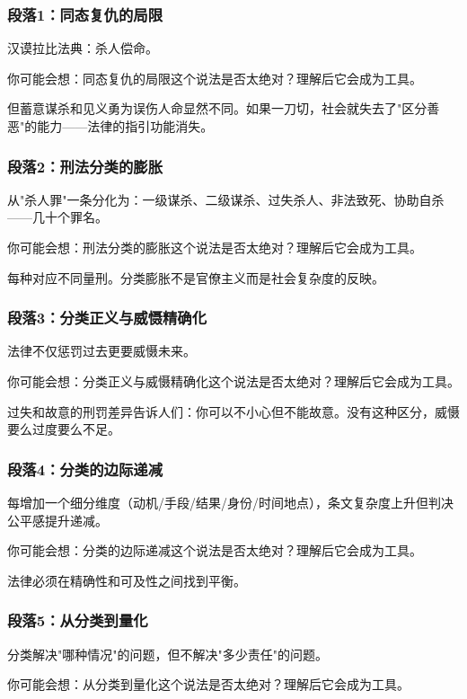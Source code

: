 \documentclass[a4paper,12pt]{book}
\newenvironment{motivation}{\begin{tcolorbox}[colback=gray!10,colframe=gray!60,title=\textit{本章动机},fonttitle=\bfseries,arc=0mm,leftrule=3mm]\small\itshape}{\end{tcolorbox}}
\begin{document}
\begin{motivation}
\begin{motivation}
\begin{motivation}
	\subsubsection*{段落1：同态复仇的局限}
	汉谟拉比法典：杀人偿命。
	\begin{tcolorbox}[colback=yellow!5, title=\textit{读者行为预测}]
		你可能会想：同态复仇的局限这个说法是否太绝对？理解后它会成为工具。
	\end{tcolorbox}

但蓄意谋杀和见义勇为误伤人命显然不同。如果一刀切，社会就失去了"区分善恶"的能力——法律的指引功能消失。

	\subsubsection*{段落2：刑法分类的膨胀}
	从"杀人罪"一条分化为：一级谋杀、二级谋杀、过失杀人、非法致死、协助自杀——几十个罪名。
	\begin{tcolorbox}[colback=yellow!5, title=\textit{读者行为预测}]
		你可能会想：刑法分类的膨胀这个说法是否太绝对？理解后它会成为工具。
	\end{tcolorbox}

每种对应不同量刑。分类膨胀不是官僚主义而是社会复杂度的反映。

	\subsubsection*{段落3：分类正义与威慑精确化}
	法律不仅惩罚过去更要威慑未来。
	\begin{tcolorbox}[colback=yellow!5, title=\textit{读者行为预测}]
		你可能会想：分类正义与威慑精确化这个说法是否太绝对？理解后它会成为工具。
	\end{tcolorbox}

过失和故意的刑罚差异告诉人们：你可以不小心但不能故意。没有这种区分，威慑要么过度要么不足。

	\subsubsection*{段落4：分类的边际递减}
	每增加一个细分维度（动机/手段/结果/身份/时间地点），条文复杂度上升但判决公平感提升递减。
	\begin{tcolorbox}[colback=yellow!5, title=\textit{读者行为预测}]
		你可能会想：分类的边际递减这个说法是否太绝对？理解后它会成为工具。
	\end{tcolorbox}

法律必须在精确性和可及性之间找到平衡。

	\subsubsection*{段落5：从分类到量化}
	分类解决"哪种情况"的问题，但不解决"多少责任"的问题。
	\begin{tcolorbox}[colback=yellow!5, title=\textit{读者行为预测}]
		你可能会想：从分类到量化这个说法是否太绝对？理解后它会成为工具。
	\end{tcolorbox}


\end{motivation}
\end{motivation}
\end{motivation}
\end{document}
